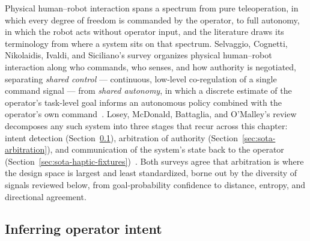 Physical human--robot interaction spans a spectrum from pure teleoperation, in which every degree of freedom is commanded by the operator, to full autonomy, in which the robot acts without operator input, and the literature draws its terminology from where a system sits on that spectrum. Selvaggio, Cognetti, Nikolaidis, Ivaldi, and Siciliano's survey organizes physical human--robot interaction along who commands, who senses, and how authority is negotiated, separating \emph{shared control} --- continuous, low-level co-regulation of a single command signal --- from \emph{shared autonomy}, in which a discrete estimate of the operator's task-level goal informs an autonomous policy combined with the operator's own command~\cite{selvaggio2021autonomy}. Losey, McDonald, Battaglia, and O'Malley's review decomposes any such system into three stages that recur across this chapter: intent detection (Section~\ref{sec:sota-intent}), arbitration of authority (Section~\ref{sec:sota-arbitration}), and communication of the system's state back to the operator (Section~\ref{sec:sota-haptic-fixtures})~\cite{losey2018review}. Both surveys agree that arbitration is where the design space is largest and least standardized, borne out by the diversity of signals reviewed below, from goal-probability confidence to distance, entropy, and directional agreement.

\subsection{Inferring operator intent}
\label{sec:sota-intent}


